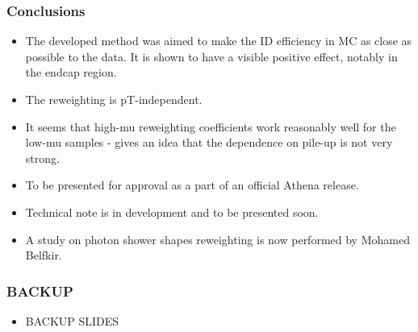 \documentclass{beamer}
\begin{document}
\begin{frame}
\frametitle{Conclusions}

\begin{itemize}
\item The developed method was aimed to make the ID efficiency in MC as close as possible to the data. It is shown to have a visible positive effect, notably in the endcap region.
\item The reweighting is pT-independent.
\item It seems that high-mu reweighting coefficients work reasonably well for the low-mu samples - gives an idea that the dependence on pile-up is not very strong.
\item To be presented for approval as a part of an official Athena release. 
\item Technical note is in development and to be presented soon. 
\item A study on photon shower shapes reweighting is now performed by Mohamed Belfkir.

\end{itemize}

\end{frame}

\begin{frame}
\frametitle{BACKUP}

\begin{itemize}
\item BACKUP SLIDES
\end{itemize}

\end{frame}

\end{document}
